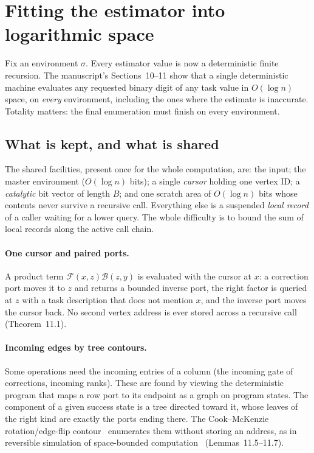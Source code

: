\documentclass[11pt]{article}
\theoremstyle{definition}
\theoremstyle{remark}
\begin{document}
\section{Fitting the estimator into logarithmic space}\label{sec:space}

Fix an environment $\sigma$. Every estimator value is now a deterministic finite
recursion. The manuscript's Sections~10--11 show that a single deterministic
machine evaluates any requested binary digit of any task value in $O(\log n)$
space, on \emph{every} environment, including the ones where the estimate is
inaccurate. Totality matters: the final enumeration must finish on every
environment.

\subsection{What is kept, and what is shared}

The shared facilities, present once for the whole computation, are: the input;
the master environment ($O(\log n)$ bits); a single \emph{cursor} holding one
vertex ID; a \emph{catalytic} bit vector of length $B$; and one scratch area of
$O(\log n)$ bits whose contents never survive a recursive call. Everything else
is a suspended \emph{local record} of a caller waiting for a lower query. The
whole difficulty is to bound the sum of local records along the active call chain.

\paragraph{One cursor and paired ports.} A product term
$\mathcal F(x,z)\mathcal B(z,y)$ is evaluated with the cursor at $x$: a correction
port moves it to $z$ and returns a bounded inverse port, the right factor is
queried at $z$ with a task description that does not mention $x$, and the
inverse port moves the cursor back. No second vertex address is ever stored
across a recursive call (Theorem~11.1).

\paragraph{Incoming edges by tree contours.} Some operations need the incoming
entries of a column (the incoming gate of corrections, incoming ranks). These
are found by viewing the deterministic program that maps a row port to its
endpoint as a graph on program states. The component of a given success state is
a tree directed toward it, whose leaves of the right kind are exactly the ports
ending there. The Cook--McKenzie rotation/edge-flip contour~\cite{CookMcKenzie}
enumerates them without storing an address, as in reversible simulation of
space-bounded computation~\cite{LMT} (Lemmas~11.5--11.7).
\end{document}
